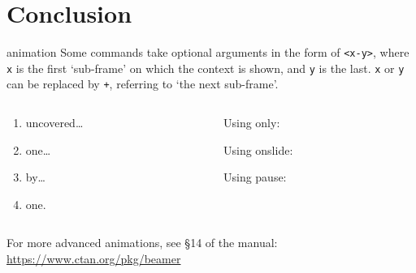 
\section{Conclusion}
\begin{frame}[fragile]{animation}
  \vfill
  Some commands take optional arguments in the form of \verb|<x-y>|,
  where \verb|x| is the first `sub-frame' on which the context is shown,
  and \verb|y| is the last. \verb|x| or \verb|y| can be replaced by \verb|+|,
  referring to `the next sub-frame'. 
  \vfill
  \begin{columns}[onlytextwidth]
  \begin{column}{.5\textwidth}
    \begin{enumerate}
      \item<+-> uncovered\ldots
      \item<+-> one\ldots
      \item<+-> by\ldots
      \item<+-> one.
    \end{enumerate}
    \end{column}
  \begin{column}{.5\textwidth}
      Using only:

      Using onslide:

      Using pause:
  \end{column}
  \end{columns}
  \vfill
  For more advanced animations, see \S 14 of the manual:\\
  \url{https://www.ctan.org/pkg/beamer}
  \vfill
\end{frame}